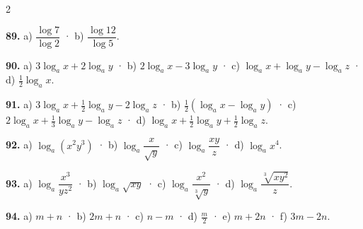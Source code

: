\documentclass[13pt,a4paper]{extarticle}
\begin{document}
\begin{multicols}{2}
\begin{minipage}{\linewidth}
\end{minipage}\par\vspace{1.6mm}
\par\noindent\begin{minipage}{\linewidth}
\textbf{89.} a) $\dfrac{\log 7}{\log 2}$ · b) $\dfrac{\log 12}{\log 5}$.\par
\end{minipage}\par\vspace{1.6mm}
\par\noindent\begin{minipage}{\linewidth}
\textbf{90.} a) $3\log_a x+2\log_a y$ · b) $2\log_a x-3\log_a y$ · c) $\log_a x+\log_a y-\log_a z$ · d) $\tfrac12\log_a x$.\par
\end{minipage}\par\vspace{1.6mm}
\par\noindent\begin{minipage}{\linewidth}
\textbf{91.} a) $3\log_a x+\tfrac12\log_a y-2\log_a z$ · b) $\tfrac12\left(\log_a x-\log_a y\right)$ · c) $2\log_a x+\tfrac13\log_a y-\log_a z$ · d) $\log_a x+\tfrac12\log_a y+\tfrac12\log_a z$.\par
\end{minipage}\par\vspace{1.6mm}
\par\noindent\begin{minipage}{\linewidth}
\textbf{92.} a) $\log_a\left(x^2y^3\right)$ · b) $\log_a\dfrac{x}{\sqrt y}$ · c) $\log_a\dfrac{xy}{z}$ · d) $\log_a x^4$.\par
\end{minipage}\par\vspace{1.6mm}
\par\noindent\begin{minipage}{\linewidth}
\textbf{93.} a) $\log_a\dfrac{x^3}{yz^2}$ · b) $\log_a\sqrt{xy}$ · c) $\log_a\dfrac{x^2}{\sqrt[3]{y}}$ · d) $\log_a\dfrac{\sqrt[3]{xy^2}}{z}$.\par
\end{minipage}\par\vspace{1.6mm}
\par\noindent\begin{minipage}{\linewidth}
\textbf{94.} a) $m+n$ · b) $2m+n$ · c) $n-m$ · d) $\tfrac{m}{2}$ · e) $m+2n$ · f) $3m-2n$.\par

\end{minipage}
\end{multicols}
\end{document}
